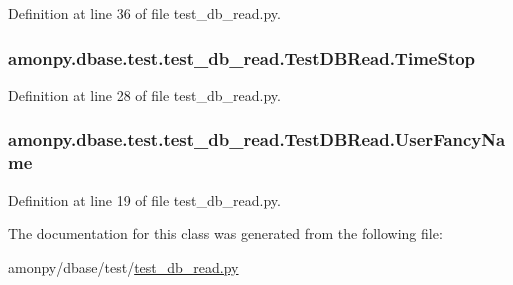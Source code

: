 Definition at line 36 of file test\-\_\-db\-\_\-read.\-py.

\hypertarget{classamonpy_1_1dbase_1_1test_1_1test__db__read_1_1_test_d_b_read_a3ee527a724daeb372b8fe60472ba5ce4}{
\subsubsection[{Time\-Stop}]{\setlength{\rightskip}{0pt plus 5cm}amonpy.\-dbase.\-test.\-test\-\_\-db\-\_\-read.\-Test\-D\-B\-Read.\-Time\-Stop}}\label{classamonpy_1_1dbase_1_1test_1_1test__db__read_1_1_test_d_b_read_a3ee527a724daeb372b8fe60472ba5ce4}


Definition at line 28 of file test\-\_\-db\-\_\-read.\-py.

\hypertarget{classamonpy_1_1dbase_1_1test_1_1test__db__read_1_1_test_d_b_read_a9ed55e19e8187469a496695884509101}{
\subsubsection[{User\-Fancy\-Name}]{\setlength{\rightskip}{0pt plus 5cm}amonpy.\-dbase.\-test.\-test\-\_\-db\-\_\-read.\-Test\-D\-B\-Read.\-User\-Fancy\-Name}}\label{classamonpy_1_1dbase_1_1test_1_1test__db__read_1_1_test_d_b_read_a9ed55e19e8187469a496695884509101}


Definition at line 19 of file test\-\_\-db\-\_\-read.\-py.



The documentation for this class was generated from the following file\-:\begin{DoxyCompactItemize}
\item 
amonpy/dbase/test/\hyperlink{test__db__read_8py}{test\-\_\-db\-\_\-read.\-py}\end{DoxyCompactItemize}
